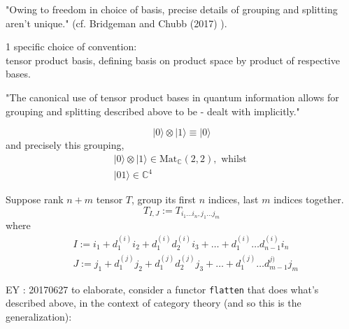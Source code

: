 \documentclass[10pt]{amsart}
\begin{document}
\begin{multicols*}{2}
"Owing to freedom in choice of basis, precise details of grouping and splitting aren't unique." (cf. Bridgeman and Chubb (2017) \cite{BrCh2017}).  

1 specific choice of convention:  \\
tensor product basis, defining basis on product space by product of respective bases.  

"The canonical use of tensor product bases in quantum information allows for grouping and splitting described above to be - dealt with implicitly."  


\begin{equation}
 | 0 \rangle \otimes | 1 \rangle \equiv | 0 \rangle 
\end{equation} and precisely this grouping, 
\begin{equation}
\begin{gathered}
	| 0 \rangle \otimes | 1 \rangle \in \text{Mat}_{\mathbb{C}}(2,2), \text{ whilst } \\ 
 | 0 1 \rangle \in \mathbb{C}^4  
\end{gathered}
\end{equation}

Suppose rank $n+m$ tensor $T$, group its first $n$ indices, last $m$ indices together.
\[
T_{I,J} := T_{i_1\dots i_n,j_1\dots j_m}
\]
where 
\[
\begin{aligned}
	& I := i_1 + d_1^{(i)} i_2 + d_1^{(i)}  d_2^{(i)} i_3 + \dots + d_1^{(i)} \dots d_{n-1}^{(i)} i_n \\ 
	& J := j_1 + d_1^{(j)} j_2 + d_1^{(j)}  d_2^{(j)} j_3 + \dots + d_1^{(j)} \dots d_{m-1}^{j)} j_m 
\end{aligned}
\]

EY : 20170627 to elaborate, consider a functor \verb|flatten| that does what's described above, in the context of category theory (and so this is the generalization):


\end{multicols*}
\end{document}
